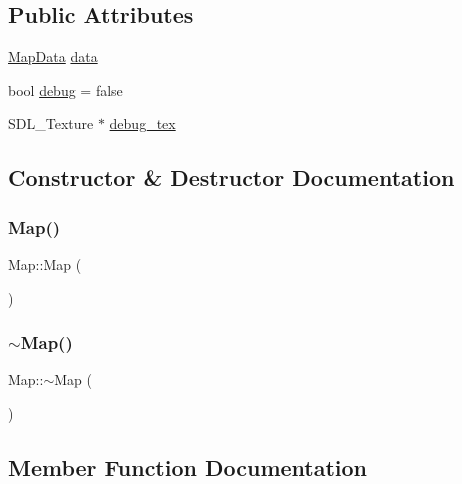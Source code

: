 \subsection*{Public Attributes}
\begin{DoxyCompactItemize}
\item 
\mbox{\hyperlink{struct_map_data}{Map\+Data}} \mbox{\hyperlink{class_map_a19a9af67d7d9ce62ab11bc52b204ad8b}{data}}
\item 
bool \mbox{\hyperlink{class_map_adeb158eea4e62856e831377972063aa5}{debug}} = false
\item 
S\+D\+L\+\_\+\+Texture $\ast$ \mbox{\hyperlink{class_map_a267ec15b70252a94a471255e1a8eb02d}{debug\+\_\+tex}}
\end{DoxyCompactItemize}


\subsection{Constructor \& Destructor Documentation}
\mbox{\label{class_map_a0f5ad0fd4563497b4214038cbca8b582}} 
\subsubsection{\texorpdfstring{Map()}{Map()}}
{\footnotesize\ttfamily Map\+::\+Map (\begin{DoxyParamCaption}{ }\end{DoxyParamCaption})}

\mbox{\label{class_map_aa403fbe09394ccf39747588f5168e3b2}} 
\subsubsection{\texorpdfstring{$\sim$Map()}{~Map()}}
{\footnotesize\ttfamily Map\+::$\sim$\+Map (\begin{DoxyParamCaption}{ }\end{DoxyParamCaption})\hspace{0.3cm}{\ttfamily [virtual]}}



\subsection{Member Function Documentation}
\mbox{\label{class_map_a6b7219ea01063fe83b7fa13e196a17cd}} 
